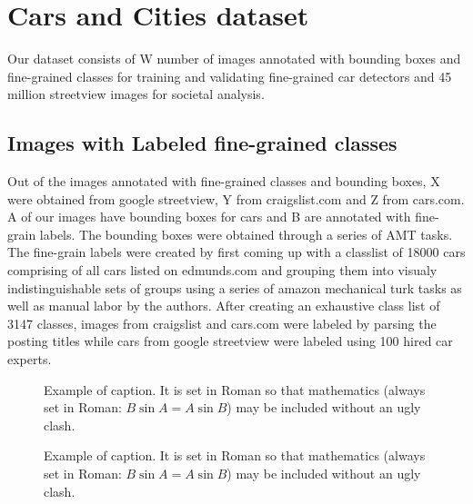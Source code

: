 \documentclass[10pt,twocolumn,letterpaper]{article}
\begin{document}
\section{Cars and Cities dataset}
Our dataset consists of W number of images annotated with bounding boxes and fine-grained classes for training and validating fine-grained car detectors and 45 million streetview images for societal analysis.

\subsection{Images with Labeled fine-grained classes}
Out of the images annotated with fine-grained classes and bounding boxes, X were obtained from google streetview, Y from craigslist.com and Z from cars.com. A of our images have bounding boxes for cars and B are annotated with fine-grain labels. The bounding boxes were obtained through a series of AMT tasks. The fine-grain labels were created by first coming up with a classlist of 18000 cars comprising of all cars listed on edmunds.com and grouping them into visualy indistinguishable sets of groups using a series of amazon mechanical turk tasks as well as manual labor by the authors. After creating an exhaustive class list of 3147 classes, images from craigslist and cars.com were labeled by parsing the posting titles while cars from google streetview were labeled using 100 hired car experts.

\begin{figure}[t]
\begin{center}
\fbox{\rule{0pt}{2in} \rule{0.9\linewidth}{0pt}}
\end{center}
   \caption{Example of caption.  It is set in Roman so that mathematics
   (always set in Roman: $B \sin A = A \sin B$) may be included without an
   ugly clash.}
\label{fig:dataset1}
\end{figure}

\begin{figure}[t]
\begin{center}
\fbox{\rule{0pt}{2in} \rule{0.9\linewidth}{0pt}}
\end{center}
   \caption{Example of caption.  It is set in Roman so that mathematics
   (always set in Roman: $B \sin A = A \sin B$) may be included without an
   ugly clash.}
\label{fig:dataset2}
\end{figure}
\end{document}
